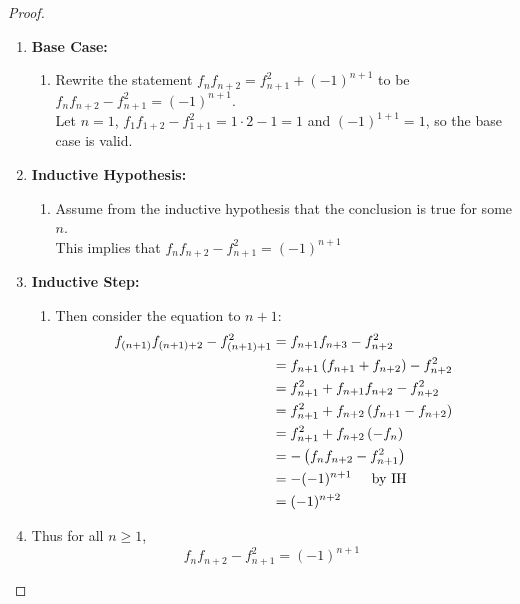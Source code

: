 \documentclass[class=article, crop=false]{standalone}
\begin{document}
\subsubsection{}
\begin{proof}
	$ $
	\begin{enumerate}
	  \item[] \textbf{Base Case:}
		\begin{enumerate}
		  \item[] Rewrite the statement $f_nf_{n+2}=f_{n+1}^2+(-1)^{n+1}$ to be $f_nf_{n+2}-f_{n+1}^2 =(-1)^{n+1}$. \\
		  Let $n=1$, $f_1 f_{1+2} - f_{1+1}^2 = 1\cdot2 - 1 = 1$ and $(-1)^{1+1} = 1$, so the base case is valid.
		\end{enumerate} 
	  \item[] \textbf{Inductive Hypothesis:}
		\begin{enumerate}
		  \item[] Assume from the inductive hypothesis that the conclusion is true for some $n$.\\
		  This implies that $f_nf_{n+2}-f_{n+1}^2 =(-1)^{n+1}$
		\end{enumerate}
	  \item[] \textbf{Inductive Step:}
		\begin{enumerate}
		  \item[] Then consider the equation to $n+1$:
			\begin{align*}
			  f_{(n+1)} f_{(n+1)+2} - f_{(n+1)+1}^2 &= f_{n+1} f_{n+3} - f_{n+2}^2 \\
			  &= f_{n+1} \left(f_{n+1} + f_{n+2}\right) - f_{n+2}^2 \\
			  &= f_{n+1}^2 + f_{n+1}f_{n+2} - f_{n+2}^2 \\
			  &= f_{n+1}^2 + f_{n+2} \left(f_{n+1} - f_{n+2}\right) \\
			  &= f_{n+1}^2 + f_{n+2} \left( - f_{n}\right) \\
			  &= -\left(f_n f_{n+2} - f_{n+1}^2\right) \\
			  &= - (-1)^{n+1} \hspace{5mm}\text{by IH} \\
			  &= (-1)^{n+2}
			\end{align*} 
		\end{enumerate}
	  \item[] Thus for all $n\geq 1$, $$f_nf_{n+2}-f_{n+1}^2 =(-1)^{n+1}$$
	\end{enumerate}
  \end{proof}
\end{document}
